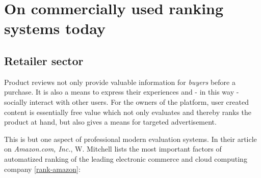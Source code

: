 
\section{On commercially used ranking systems today}

\subsection{Retailer sector} %
Product reviews not only provide valuable information for {\emph{buyers}} before a purchase.
It is also a means to express their experiences and - in this way - socially interact with other users. 
For the owners of the platform, user created content is essentially free value which not only 
evaluates and thereby ranks the product at hand, but also gives a means for targeted advertisement. 

This is but one aspect of professional modern evaluation systems.
In their article on {\emph{Amazon.com, Inc.}}, W. Mitchell lists the most important factors of automatized ranking of 
the leading electronic commerce and cloud computing company [\href{https://startupbros.com/rank-amazon/}{rank-amazon}]: %

{\color{green}{
	TODO: redo this list, make many of those items to topics in themselves. If you keep the list as such, write it down more concisely.
}} %

